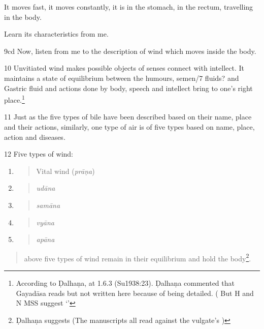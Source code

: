 \begin{translation}
It moves fast, it moves constantly, it is in the stomach, in the rectum,
travelling in the body.  

Learn its characteristics from me.
     
     

\item[9cd] Now, listen from me to the description of wind which moves inside the
body.

\item[10] Unvitiated wind makes possible objects of senses connect with
intellect. It maintains a state of equilibrium between the humours,
semen/7 fluids? and Gastric fluid and actions done by body, speech and
intellect bring to one's right place.\footnote{ According to Ḍalhaṇa,
 at 1.6.3 (Su1938:23). Ḍalhaṇa commented that
Gayadāsa reads  but not written here
because of being detailed. ( But H and N MSS suggest  
`'}

\item[11] Just as the five types of bile have been described based 
on their
name, place and their actions, similarly, one type of air is of five
types based on name, place, action and diseases.

\item[12] Five types of wind:

\begin{enumerate}
\def\labelenumi{\arabic{enumi}.}
\item
\begin{quote}
Vital wind (\emph{prāṇa})
\end{quote}
\item
\begin{quote}
\emph{udāna }
\end{quote}
\item
\begin{quote}
\emph{samāna}
\end{quote}
\item
\begin{quote}
\emph{vyāna}
\end{quote}
\item
\begin{quote}
\emph{apāna}
\end{quote}
\end{enumerate}

\begin{quote}
above five types of wind remain in their equilibrium and hold the
body\footnote{ Ḍalhaṇa suggests 
(The manuscripts all read    against the vulgate's  )}.
\end{quote}


\end{translation}
